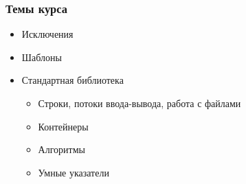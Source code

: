 \documentclass{beamer}
\begin{document}
\begin{frame}

    \frametitle{Темы курса}

    \begin{itemize}

        \item Исключения

        \item Шаблоны

        \item Стандартная библиотека

            \begin{itemize}

                \item Строки, потоки ввода-вывода, работа с файлами

                \item Контейнеры

                \item Алгоритмы

                \item Умные указатели

            \end{itemize}

    \end{itemize}

\end{frame}
\end{document}
